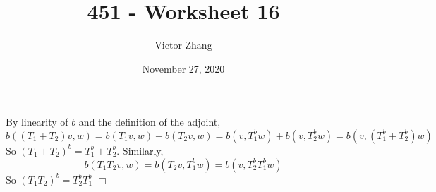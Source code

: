 \documentclass{article}
\title{451 - Worksheet 16}
\author{Victor Zhang}
\date{November 27, 2020}
\begin{document}
\maketitle

\section{}
By linearity of $b$ and the definition of the adjoint,
$$b((T_1+T_2)v,w) = b(T_1v,w) + b(T_2v,w) = b(v, T_1^bw) + b(v, T_2^bw) = b(v, (T_1^b+T_2^b)w)$$
So $(T_1+T_2)^b = T_1^b + T_2^b$.
Similarly,
$$b(T_1T_2v,w) = b(T_2v, T_1^bw) = b(v, T_2^bT_1^bw)$$
So $(T_1T_2)^b = T_2^bT_1^b$ $\Box$
\end{document}
